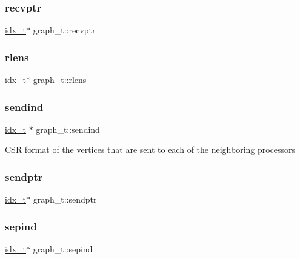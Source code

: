 \subsubsection{\texorpdfstring{recvptr}{recvptr}}
{\footnotesize\ttfamily \hyperlink{a00876_aaa5262be3e700770163401acb0150f52}{idx\+\_\+t}$\ast$ graph\+\_\+t\+::recvptr}

\mbox{\label{a00734_aeed6b54824c10432c7b64927d03141c2}} 
\subsubsection{\texorpdfstring{rlens}{rlens}}
{\footnotesize\ttfamily \hyperlink{a00876_aaa5262be3e700770163401acb0150f52}{idx\+\_\+t}$\ast$ graph\+\_\+t\+::rlens}

\mbox{\label{a00734_ac2f30b1e6d043c41e0d57de26557be5b}} 
\subsubsection{\texorpdfstring{sendind}{sendind}}
{\footnotesize\ttfamily \hyperlink{a00876_aaa5262be3e700770163401acb0150f52}{idx\+\_\+t} $\ast$ graph\+\_\+t\+::sendind}

C\+SR format of the vertices that are sent to each of the neighboring processors \mbox{\label{a00734_a2e9776f42148eabc41c17bbb0c71c19c}} 
\subsubsection{\texorpdfstring{sendptr}{sendptr}}
{\footnotesize\ttfamily \hyperlink{a00876_aaa5262be3e700770163401acb0150f52}{idx\+\_\+t}$\ast$ graph\+\_\+t\+::sendptr}

\mbox{\label{a00734_ad3013a301ba5be9f81a8b53667d16c3d}} 
\subsubsection{\texorpdfstring{sepind}{sepind}}
{\footnotesize\ttfamily \hyperlink{a00876_aaa5262be3e700770163401acb0150f52}{idx\+\_\+t}$\ast$ graph\+\_\+t\+::sepind}


